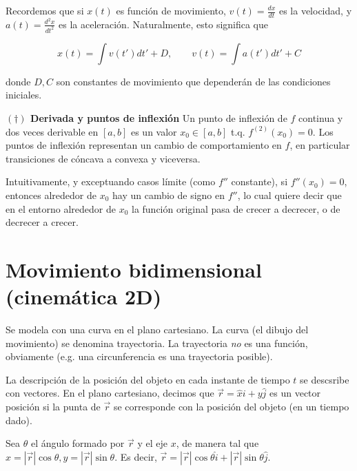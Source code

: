 \documentclass[12pt]{article}
\theoremstyle{definition}
\begin{document}
Recordemos que si $x(t)$ es función de movimiento, $v(t) = \frac{dx}{dt}$ es la
velocidad, y $a(t) = \frac{d^2 x}{dt^2}$ es la aceleración. Naturalmente, esto
significa que 

\begin{equation*}
    x(t) = \int v(t') dt' + D, \qquad v(t) = \int a(t') dt' + C
\end{equation*}

donde $D, C$ son constantes de movimiento que dependerán de las condiciones
iniciales.

\begin{shaded}

\textbf{$( \dagger )$ Derivada y puntos de inflexión}
Un punto de inflexión de $f$ continua y dos veces derivable en $[a, b]$ es un
valor $x_0 \in [a, b]$ t.q. $f^{(2)}(x_0) = 0$. Los puntos de inflexión
representan un cambio de comportamiento en $f$, en particular transiciones de
cóncava a convexa y viceversa.

Intuitivamente, y  exceptuando casos límite (como $f''$ constante), si $f''(x_0) = 0$, entonces alrededor de $x_0$ hay un cambio de
signo en $f''$, lo cual quiere decir que en el entorno alrededor de $x_0$ la
función original pasa de crecer a decrecer, o de decrecer a crecer.

\end{shaded}

\pagebreak 

\section{Movimiento bidimensional (cinemática 2D)}

Se modela con una curva en el plano cartesiano. La curva (el dibujo del
movimiento) se denomina trayectoria. La trayectoria \textit{no} es una función,
obviamente (e.g. una circunferencia es una trayectoria posible).

La descripción de la posición del objeto en cada instante de tiempo $t$ se
descsribe con vectores. En el plano cartesiano, decimos que $\vec{r} = \hat{x}i
+ y \hat{j}$
es un vector posición si la punta de $\vec{r}$ se corresponde con la posición
del objeto (en un tiempo dado).

Sea $\theta$ el ángulo formado por $\vec{r}$ y el eje $x$, de manera tal que $x
= \left| \vec{r} \right| \cos \theta, y = \left| \vec{r} \right| \sin \theta$.
Es decir, $\vec{r} = \left| \vec{r} \right| \cos \theta \hat{i} + \left|
\vec{r}\right| \sin \theta \hat{j} $.
\end{document}
